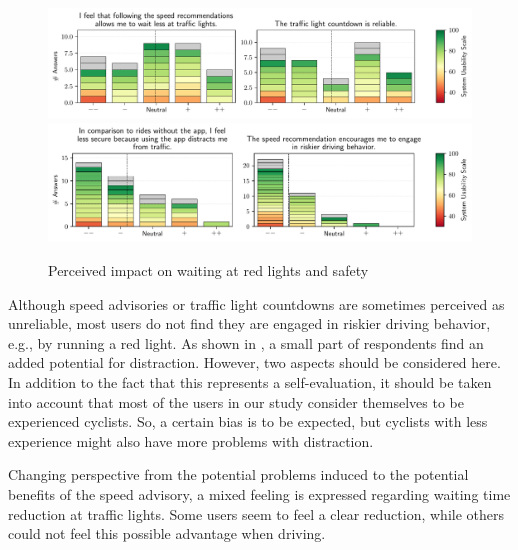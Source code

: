 \begin{figure}[t]
\caption{Perceived impact on waiting at red lights and safety}\label{fig:waiting-time-at-traffic-lights}
\includegraphics[width=\linewidth]{images/app-usability-questions-waiting-time-at-traffic-lights.pdf} 
\\
\includegraphics[width=\linewidth]{images/app-usability-questions-app-impact-on-safety.pdf}
\end{figure}

Although speed advisories or traffic light countdowns are sometimes perceived as unreliable, most users do not find they are engaged in riskier driving behavior, e.g., by running a red light. As shown in , a small part of respondents find an added potential for distraction. However, two aspects should be considered here. In addition to the fact that this represents a self-evaluation, it should be taken into account that most of the users in our study consider themselves to be experienced cyclists. So, a certain bias is to be expected, but cyclists with less experience might also have more problems with distraction.

Changing perspective from the potential problems induced to the potential benefits of the speed advisory, a mixed feeling is expressed regarding waiting time reduction at traffic lights. Some users seem to feel a clear reduction, while others could not feel this possible advantage when driving.

